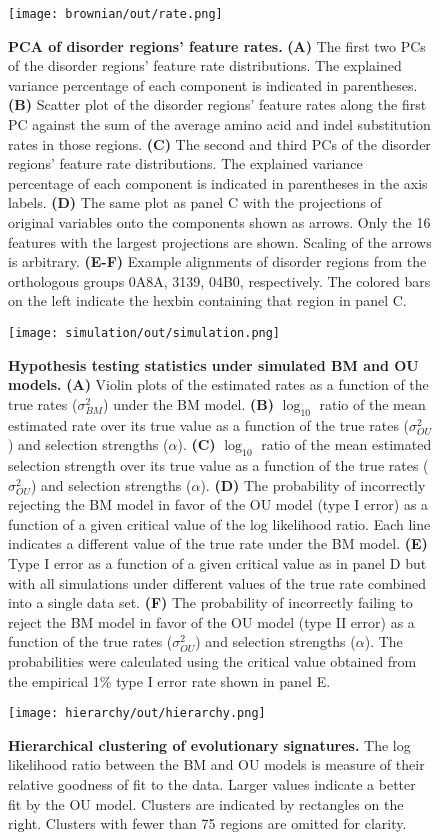 \begin{figure}[h!]
\texttt{[image: brownian/out/rate.png]}
\centering
\caption{\textbf{PCA of disorder regions' feature rates.}
\textbf{(A)} The first two PCs of the disorder regions' feature rate distributions. The explained variance percentage of each component is indicated in parentheses. \textbf{(B)} Scatter plot of the disorder regions' feature rates along the first PC against the sum of the average amino acid and indel substitution rates in those regions. \textbf{(C)} The second and third PCs of the disorder regions' feature rate distributions. The explained variance percentage of each component is indicated in parentheses in the axis labels. \textbf{(D)} The same plot as panel C with the projections of original variables onto the components shown as arrows. Only the 16 features with the largest projections are shown. Scaling of the arrows is arbitrary. \textbf{(E-F)} Example alignments of disorder regions from the orthologous groups 0A8A, 3139, 04B0, respectively. The colored bars on the left indicate the hexbin containing that region in panel C.}
\label{fig:rate}
\end{figure}

\begin{figure}[h!]
\texttt{[image: simulation/out/simulation.png]}
\centering
\caption{\textbf{Hypothesis testing statistics under simulated BM and OU models.}
\textbf{(A)} Violin plots of the estimated rates as a function of the true rates ($\sigma^2_{BM}$) under the BM model. \textbf{(B)} $\log_{10}$ ratio of the mean estimated rate over its true value as a function of the true rates ($\sigma^2_{OU}$) and selection strengths ($\alpha$). \textbf{(C)} $\log_{10}$ ratio of the mean estimated selection strength over its true value as a function of the true rates ($\sigma^2_{OU}$) and selection strengths ($\alpha$). \textbf{(D)} The probability of incorrectly rejecting the BM model in favor of the OU model (type I error) as a function of a given critical value of the log likelihood ratio. Each line indicates a different value of the true rate under the BM model. \textbf{(E)} Type I error as a function of a given critical value as in panel D but with all simulations under different values of the true rate combined into a single data set. \textbf{(F)} The probability of incorrectly failing to reject the BM model in favor of the OU model (type II error) as a function of the true rates ($\sigma^2_{OU}$) and selection strengths ($\alpha$). The probabilities were calculated using the critical value obtained from the empirical 1\% type I error rate shown in panel E.}
\label{fig:simulation}
\end{figure}

\begin{figure}[h!]
\texttt{[image: hierarchy/out/hierarchy.png]}
\centering
\caption{\textbf{Hierarchical clustering of evolutionary signatures.}
The log likelihood ratio between the BM and OU models is measure of their relative goodness of fit to the data. Larger values indicate a better fit by the OU model. Clusters are indicated by rectangles on the right. Clusters with fewer than 75 regions are omitted for clarity.}
\label{fig:hierarchy}
\end{figure}
